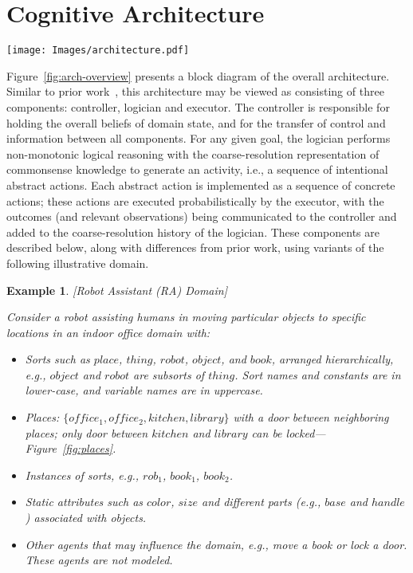 \documentclass[letterpaper, 10 pt, conference]{ieeeconf}  %
\newtheorem{example2}{\bf Example}
\begin{document}
\section{Cognitive Architecture}
\label{sec:arch}

\begin{figure*}[tb]
\centering
\texttt{[image: Images/architecture.pdf]}
\caption{Architecture uses logic representation of the world at two
  levels of resolution}
\label{fig:arch-overview}
\end{figure*}

Figure~\ref{fig:arch-overview} presents a block diagram of the overall
architecture. Similar to prior work~\cite{sridharan2017refinement},
this architecture may be viewed as consisting of three components:
controller, logician and executor. The controller is responsible for
holding the overall beliefs of domain state, and for the transfer of
control and information between all components. For any given goal,
the logician performs non-monotonic logical reasoning with the
coarse-resolution representation of commonsense knowledge to generate
an activity, i.e., a sequence of intentional abstract actions. Each
abstract action is implemented as a sequence of concrete actions;
these actions are executed probabilistically by the executor, with the
outcomes (and relevant observations) being communicated to the
controller and added to the coarse-resolution history of the logician.
These components are described below, along with differences from
prior work, using variants of the following illustrative domain.

\begin{example2}\label{ex:illus-example}[Robot Assistant (RA) Domain]
  {\rm Consider a robot assisting humans in moving particular objects
    to specific locations in an indoor office domain with:
    \begin{itemize}
    \item Sorts such as $place$, $thing$, $robot$, $object$, and
      $book$, arranged hierarchically, e.g., $object$ and $robot$ are
      subsorts of $thing$. Sort names and constants are in lower-case,
      and variable names are in uppercase.
    \item Places: $\{office_1, office_2, kitchen, library\}$ with a
      door between neighboring places; only door between $kitchen$ and
      $library$ can be locked---Figure~\ref{fig:places}.
    \item Instances of sorts, e.g., $rob_1$, $book_1$, $book_2$.
    \item Static attributes such as $color$, $size$ and different
      parts (e.g., $base$ and $handle$) associated with objects.
    \item Other agents that may influence the domain, e.g., move a
      book or lock a door. These agents are not modeled.
    \end{itemize}
  }
\end{example2}
\end{document}
